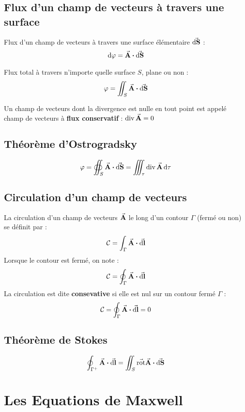 \documentclass[a4paper,12pt]{article}
\newcommand{\rot}{\va{\operatorname{rot}}}
\renewcommand{\div}{\operatorname{div}}
\begin{document}
        \subsection{Flux d'un champ de vecteurs à travers une surface}
            Flux d'un champ de vecteurs à travers une surface élémentaire $ \va{\dd S} $ : 
                $$ \dd \varphi = \va{A} \vdot \va{\dd S} $$
            
            Flux total à travers n'importe quelle surface $S$, plane ou non :
                $$ \varphi = \iint_S \va{A} \vdot \va{\dd S} $$ 

            Un champ de vecteurs dont la divergence est nulle en tout point est appelé
            champ de vecteurs à \textbf{flux conservatif} : $ \div{\va{A}} = 0 $
        
        \subsection{Théorème d'Ostrogradsky}
            
            $$ \varphi = \oiint_S \va{A} \vdot \va{\dd S} = \iiint_\tau \div{\va{A}} \, \dd \tau$$
        
        \subsection{Circulation d'un champ de vecteurs}
            
            La circulation d'un champ de vecteurs $ \va{A} $ le long d'un contour $ \Gamma $ (fermé ou non) se définit par :
                $$ \mathcal{C} = \int_\Gamma \va{A} \vdot \va{\dd l} $$
            Lorsque le contour est fermé, on note :
                $$ \mathcal{C} = \oint_\Gamma \va{A} \vdot \va{\dd l} $$
            La circulation est dite \textbf{consevative} si elle est nul sur un contour fermé $ \Gamma $ :
                $$ \mathcal{C} = \oint_\Gamma \va{A} \vdot \va{\dd l} = 0 $$

            
                

        \subsection{Théorème de Stokes}
            
            $$ \oint_{\Gamma^+} \va{A} \vdot \va{\dd l} = \iint_S \rot{\va{A}} \vdot \va{\dd S} $$


    \section{Les Equations de Maxwell}
\end{document}
